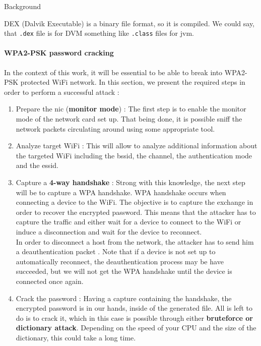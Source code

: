 \begin{chaptercover}{Background}
\begin{indentbox}{1cm}
DEX (Dalvik Executable) is a binary file format, so it is compiled. We could say, that \texttt{.dex} file is for DVM something like \texttt{.class} files for \acrshort{jvm}.
\end{indentbox}

\paragraph{WPA2-PSK password cracking} In the context of this work, it will be essential to be able to break into WPA2-PSK protected WiFi network. In this section, we present the required steps in order to perform a successful attack :
\begin{enumerate}
  \item Prepare the \acrshort{nic} (\textbf{monitor mode}) : The first step is to enable the monitor mode of the network card set up. That being done, it is possible sniff the network packets circulating around using some appropriate tool.
  \item Analyze target WiFi : This will allow to analyze additional information about the targeted WiFi including the \acrshort{bssid}, the channel, the authentication mode and the \acrshort{essid}.
  \item Capture a \textbf{4-way handshake} : Strong with this knowledge, the next step will be to capture a WPA handshake. WPA handshake occurs when connecting a device to the WiFi. The objective is to capture the exchange in order to recover the encrypted password. This means that the attacker has to capture the traffic and either wait for a device to connect to the WiFi or induce a disconnection and wait for the device to reconnect. \newline \\
  In order to disconnect a host from the network, the attacker has to send him a deauthentication packet \cite{deauthentication}. Note that if a device is not set up to automatically reconnect, the deauthentication process may be have succeeded, but we will not get the WPA handshake until the device is connected once again.
  \item Crack the password : Having a capture containing the handshake, the encrypted password is in our hands, inside of the generated file. All is left to do is to crack it, which in this case is possible through either \textbf{bruteforce or dictionary attack}. Depending on the speed of your CPU and the size of the dictionary, this could take a long time.
\end{enumerate}


\end{chaptercover}
